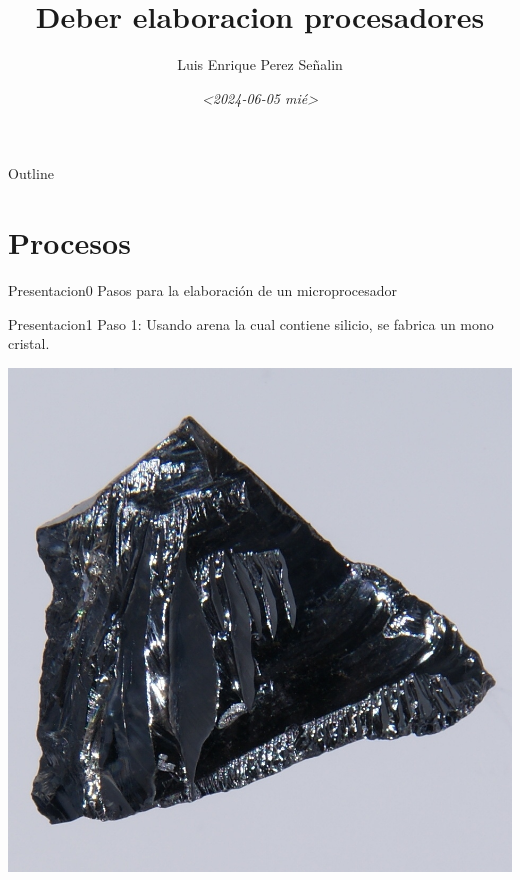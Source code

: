 \documentclass[presentation]{beamer}
\author{Luis Enrique Perez Señalin}
\date{\textit{<2024-06-05 mié>}}
\title{Deber elaboracion procesadores}
\begin{document}
\maketitle
\begin{frame}{Outline}
\tableofcontents
\end{frame}


\section{Procesos}
\label{sec:orgeafec88}
\begin{frame}[label={sec:org5436396}]{Presentacion0}
Pasos para la elaboración de un microprocesador
\end{frame}

\begin{frame}[label={sec:orgbcbc41b}]{Presentacion1}
Paso 1:
Usando arena la cual contiene silicio, se fabrica un mono cristal.
\begin{center}
\includegraphics[width=.9\linewidth]{./paso1.jpg}
\end{center}
\end{frame}
\end{document}
